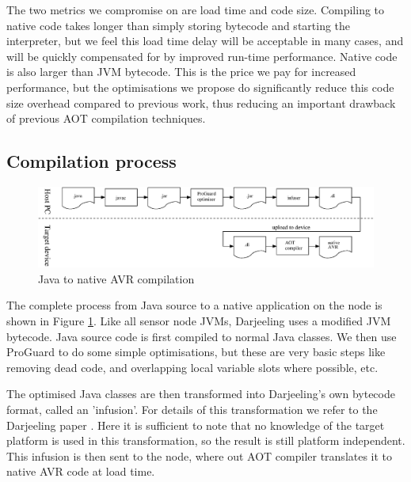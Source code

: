 The two metrics we compromise on are load time and code size. Compiling to native code takes longer than simply storing bytecode and starting the interpreter, but we feel this load time delay will be acceptable in many cases, and will be quickly compensated for by improved run-time performance. Native code is also larger than JVM bytecode. This is the price we pay for increased performance, but the optimisations we propose do significantly reduce this code size overhead compared to previous work, thus reducing an important drawback of previous AOT compilation techniques.

\subsection{Compilation process}
\label{sec-compilation-process}
\begin{figure}[]
  \includegraphics[width=\linewidth]{compilation-process.eps}
  \caption{Java to native AVR compilation}
  \label{fig-translation-process}
\end{figure}


The complete process from Java source to a native application on the node is shown in Figure \ref{fig-translation-process}. Like all sensor node JVMs, Darjeeling uses a modified JVM bytecode. Java source code is first compiled to normal Java classes. We then use ProGuard \cite{proguard} to do some simple optimisations, but these are very basic steps like removing dead code, and overlapping local variable slots where possible, etc.

The optimised Java classes are then transformed into Darjeeling's own bytecode format, called an 'infusion'. For details of this transformation we refer to the Darjeeling paper \cite{Brouwers:2009cj}. Here it is sufficient to note that no knowledge of the target platform is used in this transformation, so the result is still platform independent. This infusion is then sent to the node, where out AOT compiler translates it to native AVR code at load time.

